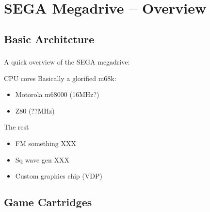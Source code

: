 \documentclass{beamer}
\begin{document}

\section{SEGA Megadrive -- Overview}
\subsection{Basic Architcture}

\begin{frame}[fragile]
\frametitle{\insertsubsection}

A quick overview of the SEGA megadrive:

\begin{block}{CPU cores}
Basically a glorified m68k:

\begin{itemize}
\item Motorola m68000 (16MHz?)
\item Z80 (??MHz)
\end{itemize}
\end{block}

\vfill

\begin{block}{The rest}
\begin{itemize}
\item FM something XXX
\item Sq wave gen XXX
\item Custom graphics chip (VDP)
\end{itemize}
\end{block}

\end{frame}


\subsection{Game Cartridges}
\end{document}
